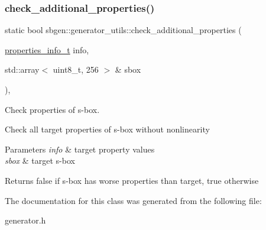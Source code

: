 \subsubsection{\texorpdfstring{check\+\_\+additional\+\_\+properties()}{check\_additional\_properties()}}
{\footnotesize\ttfamily static bool sbgen\+::generator\+\_\+utils\+::check\+\_\+additional\+\_\+properties (\begin{DoxyParamCaption}\item[{\hyperlink{structsbgen_1_1properties__info__t}{properties\+\_\+info\+\_\+t}}]{info,  }\item[{std\+::array$<$ uint8\+\_\+t, 256 $>$ \&}]{sbox }\end{DoxyParamCaption})\hspace{0.3cm}{\ttfamily [inline]}, {\ttfamily [static]}}



Check properties of s-\/box. 

Check all target properties of s-\/box without nonlinearity


\begin{DoxyParams}{Parameters}
{\em info} & target property values \\
\hline
{\em sbox} & target s-\/box \\
\hline
\end{DoxyParams}
\begin{DoxyReturn}{Returns}
false if s-\/box has worse properties than target, true otherwise 
\end{DoxyReturn}


The documentation for this class was generated from the following file\+:\begin{DoxyCompactItemize}
\item 
generator.\+h\end{DoxyCompactItemize}
